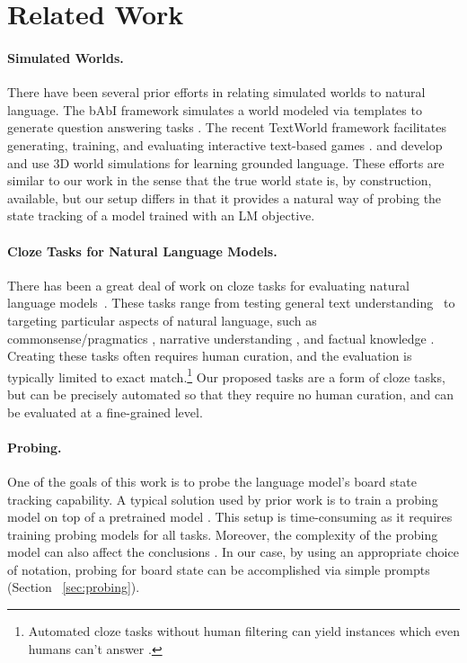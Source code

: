 \section{Related Work}
\paragraph{Simulated Worlds.} %
There have been several prior efforts in relating simulated worlds to natural language. 
The bAbI framework simulates a world modeled via templates to generate question answering tasks \citep{weston2015aicomplete}. 
The recent TextWorld framework facilitates generating, training, and evaluating interactive text-based games \citep{cote18textworld}. 
\citet{hermann17grounded} and \citet{hill17understanding} develop and use 3D world simulations for learning grounded language.
These efforts are similar to our work in the sense that the true world state is, by construction, available, but our setup differs in that it provides a natural way of probing the state tracking of a model trained with an LM objective.




\paragraph{Cloze Tasks for Natural Language Models.}
There has been a great deal of work on cloze tasks for evaluating natural language models~\citep{hermann2015cnn, hill2016cbt}. 
These tasks range from testing general text understanding~\citep{paperno-etal-2016-lambada} to targeting particular aspects of natural language, such as commonsense/pragmatics \citep{mostafazadeh-etal-2016-corpus, ettinger2020bert}, narrative understanding \citep{mostafazadeh-etal-2017-lsdsem}, and factual knowledge \citep{petroni-etal-2019-language}.
Creating these tasks often requires human curation, and the evaluation is typically limited to exact match.\footnote{Automated cloze tasks without human filtering can yield instances which even humans can't answer \citep{hill2016cbt}.}  
Our proposed tasks are a form of cloze tasks, but can be precisely 
automated so that they require no human curation, and can be evaluated at a fine-grained level. 


\paragraph{Probing.}
One of the goals of this work is to probe the language model's board state tracking capability.
A typical solution used by prior work is to train a probing model on top of a pretrained model  
\citep{ettinger-etal-2016-probing,Alain2017UnderstandingIL, adi17probing, tenney2019probing,hewitt-liang-2019-designing}. %
This setup is time-consuming as it requires training probing models for all tasks. 
Moreover, the complexity of the probing model can also affect the conclusions \citep{pimentel-etal-2020-information}. 
In our case, by using an appropriate choice of notation, probing for board state can be accomplished via simple prompts (Section ~\ref{sec:probing}). 

